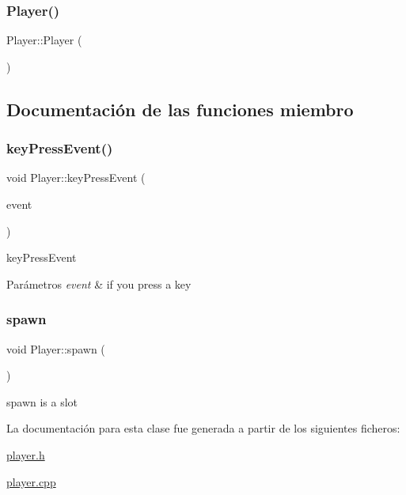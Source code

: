 \subsubsection{\texorpdfstring{Player()}{Player()}}
{\footnotesize\ttfamily Player\+::\+Player (\begin{DoxyParamCaption}{ }\end{DoxyParamCaption})}



\subsection{Documentación de las funciones miembro}
\hypertarget{class_player_a4d269c4118c29b0ee85c1e0f674260ee}{}\label{class_player_a4d269c4118c29b0ee85c1e0f674260ee} 
\subsubsection{\texorpdfstring{key\+Press\+Event()}{keyPressEvent()}}
{\footnotesize\ttfamily void Player\+::key\+Press\+Event (\begin{DoxyParamCaption}\item[{Q\+Key\+Event $\ast$}]{event }\end{DoxyParamCaption})}



key\+Press\+Event 


\begin{DoxyParams}{Parámetros}
{\em event} & if you press a key \\
\hline
\end{DoxyParams}
\hypertarget{class_player_a59ae3f2c7151032a85e58b1591cad769}{}\label{class_player_a59ae3f2c7151032a85e58b1591cad769} 
\subsubsection{\texorpdfstring{spawn}{spawn}}
{\footnotesize\ttfamily void Player\+::spawn (\begin{DoxyParamCaption}{ }\end{DoxyParamCaption})\hspace{0.3cm}{\ttfamily [slot]}}



spawn is a slot 



La documentación para esta clase fue generada a partir de los siguientes ficheros\+:\begin{DoxyCompactItemize}
\item 
\hyperlink{player_8h}{player.\+h}\item 
\hyperlink{player_8cpp}{player.\+cpp}\end{DoxyCompactItemize}
